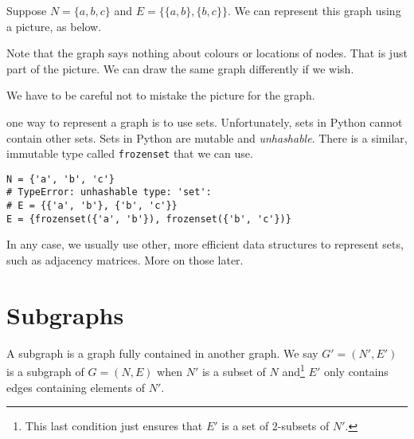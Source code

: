 \documentclass{iansnotes}
\begin{document}
  Suppose $N = \{ a, b, c \}$ and $E = \{ \{a,b\}, \{b,c\} \}$.
  We can represent this graph using a picture, as below.
  \begin{center}
  \end{center}
  Note that the graph says nothing about colours or locations of nodes.
  That is just part of the picture.
  We can draw the same graph differently if we wish.
  \begin{center}
  \end{center}
  We have to be careful not to mistake the picture for the graph.

   one way to represent a graph is to use sets.
  Unfortunately, sets in Python cannot contain other sets.
  Sets in Python are mutable and \emph{unhashable}.
  There is a similar, immutable type called \texttt{frozenset} that we can use.
  \begin{verbatim}
N = {'a', 'b', 'c'}
# TypeError: unhashable type: 'set':
# E = {{'a', 'b'}, {'b', 'c'}}
E = {frozenset({'a', 'b'}), frozenset({'b', 'c'})}
  \end{verbatim}
  In any case, we usually use other, more efficient data structures to represent sets, such as adjacency matrices.
  More on those later.

\section{Subgraphs}
  A subgraph is a graph fully contained in another graph.
  We say $G' = (N', E')$ is a subgraph of $G = (N, E)$ when $N'$ is a subset of $N$ and\footnote{This last condition just ensures that $E'$ is a set of $2$-subsets of $N'$.} $E'$ only contains edges containing elements of $N'$.
\end{document}
